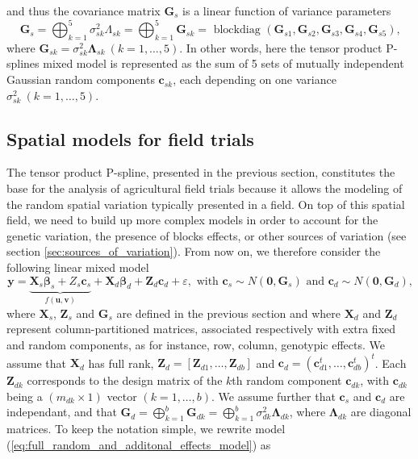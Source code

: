 and thus the covariance matrix $\mathbf{G}_s$ is a linear function of variance parameters
\begin{equation}
    \boldsymbol{G}_{s}=\bigoplus_{k=1}^{5} \sigma_{s k}^{2} \Lambda_{s k}=\bigoplus_{k=1}^{5} \boldsymbol{G}_{s k}=
    \text{ blockdiag }
    \left(\boldsymbol{G}_{s 1}, \boldsymbol{G}_{s 2}, \boldsymbol{G}_{s 3}, \boldsymbol{G}_{s 4}, \boldsymbol{G}_{s 5}\right)
    \text{,}
\end{equation}
where $\boldsymbol{G}_{s k} = \sigma_{sk}^2\boldsymbol{\Lambda}_{sk} \ (k=1,\ldots,5)$. In other words, here the tensor product P-splines mixed model is represented as the sum of 5 sets of mutually independent Gaussian random components $\mathbf{c}_{sk}$, each depending on one variance $\sigma_{sk}^2 \ (k=1,\ldots,5)$.

\subsection{Spatial models for field trials}
The tensor product P-spline, presented in the previous section, constitutes the base for the analysis of agricultural field trials because it allows the modeling of the random spatial variation typically presented in a field. On top of this spatial field, we need to build up more complex models in order to account for the genetic variation, the presence of blocks effects, or other sources of variation (see section \ref{sec:sources_of_variation}). From now on, we therefore consider the following linear mixed model
\begin{equation}
    \boldsymbol{y}=\underbrace{\boldsymbol{X}_{s} \boldsymbol{\beta}_{s}+Z_{s} \boldsymbol{c}_{s}}_{f(\boldsymbol{u}, \boldsymbol{v})}+\boldsymbol{X}_{d} \boldsymbol{\beta}_{d}+\boldsymbol{Z}_{d} \boldsymbol{c}_{d}+\varepsilon, \text { with } \boldsymbol{c}_{s} \sim N\left(\mathbf{0}, \boldsymbol{G}_{s}\right) \text { and } \boldsymbol{c}_{d} \sim N\left(\mathbf{0}, \boldsymbol{G}_{d}\right)
    \text{,}
    \label{eq:full_random_and_additonal_effects_model}
\end{equation}
where $\boldsymbol{X}_{s}$, $\boldsymbol{Z}_{s}$ and $\boldsymbol{G}_{s}$ are defined in the previous section and where $\boldsymbol{X}_{d}$ and $\boldsymbol{Z}_{d}$ represent column-partitioned matrices, associated respectively with extra fixed and random components, as for instance, row, column, genotypic effects. We assume that $\boldsymbol{X}_{d}$ has full rank, $\boldsymbol{Z}_{d}=\left[\boldsymbol{Z}_{d 1}, \ldots, \boldsymbol{Z}_{d b}\right]$ and $\boldsymbol{c}_d = \left( \boldsymbol{c}_{d1}^t,\ldots,\boldsymbol{c}_{db}^t\right)^t$. Each $\boldsymbol{Z}_{dk}$ corresponds to the design matrix of the $k$th random component $\boldsymbol{c}_{dk}$, with $\boldsymbol{c}_{dk}$ being a $(m_{dk} \times 1)$ vector $(k=1,\ldots,b)$. We assume further that $\boldsymbol{c}_s$ and $\boldsymbol{c}_d$ are independant, and that $\boldsymbol{G}_{d}=\bigoplus_{k=1}^{b} \boldsymbol{G}_{d k}=\bigoplus_{k=1}^{b} \sigma_{d k}^{2} \mathbf{\Lambda}_{d k}$, where $\boldsymbol{\Lambda}_{dk}$ are diagonal matrices. To keep the notation simple, we rewrite model (\ref{eq:full_random_and_additonal_effects_model}) as
